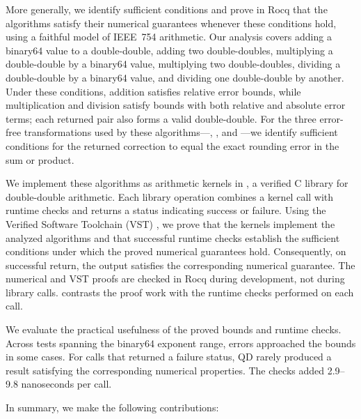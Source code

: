 More generally, we identify sufficient conditions and prove in Rocq that
the algorithms satisfy their numerical guarantees whenever these conditions
hold, using a faithful model of IEEE~754 arithmetic. Our analysis covers
adding a binary64 value to a double-double, adding two double-doubles,
multiplying a double-double by a binary64 value, multiplying two
double-doubles, dividing a double-double by a binary64 value, and dividing one
double-double by another. Under these conditions, addition satisfies relative
error bounds, while multiplication and division satisfy bounds with both 
relative and absolute error terms; each returned pair also forms a valid double-double. 
For the three error-free transformations used by these algorithms---\TwoSum{}, 
\FastTwoSum{}, and \FastTwoMult{}---we identify sufficient conditions for the 
returned correction to equal the exact rounding error in the sum or product.

We implement these algorithms as arithmetic kernels in \FenceDD{}, a verified C 
library for double-double arithmetic. Each library operation combines a kernel 
call with runtime checks and returns a status indicating success or failure. 
Using the Verified Software Toolchain (VST) \citep{Cao2018VSTFloyd}, we prove that the 
kernels implement the analyzed algorithms and that successful runtime checks 
establish the sufficient conditions under which the proved numerical guarantees 
hold. Consequently, on successful return, the output satisfies the corresponding
numerical guarantee. The numerical and VST proofs are checked in Rocq during 
development, not during library calls.  contrasts 
the proof work with the runtime checks performed on each call.



We evaluate the practical usefulness of the proved bounds and runtime checks.
Across tests spanning the binary64 exponent range, errors approached the
bounds in some cases. For calls that returned a failure status, QD rarely
produced a result satisfying the corresponding numerical properties. The
checks added 2.9--9.8 nanoseconds per call.

In summary, we make the following contributions:

